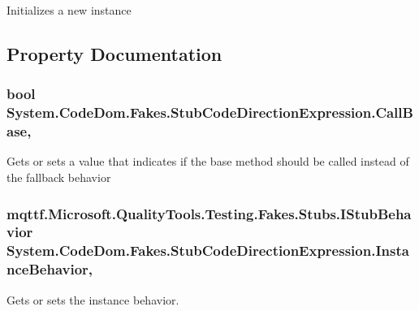 Initializes a new instance



\subsection{Property Documentation}
\hypertarget{class_system_1_1_code_dom_1_1_fakes_1_1_stub_code_direction_expression_aae514affd27491915e47d4a186b77943}{
\subsubsection[{Call\-Base}]{\setlength{\rightskip}{0pt plus 5cm}bool System.\-Code\-Dom.\-Fakes.\-Stub\-Code\-Direction\-Expression.\-Call\-Base\hspace{0.3cm}{\ttfamily [get]}, {\ttfamily [set]}}}\label{class_system_1_1_code_dom_1_1_fakes_1_1_stub_code_direction_expression_aae514affd27491915e47d4a186b77943}


Gets or sets a value that indicates if the base method should be called instead of the fallback behavior

\hypertarget{class_system_1_1_code_dom_1_1_fakes_1_1_stub_code_direction_expression_ad3dd5b794a0e92f513b08c9172bfeb03}{
\subsubsection[{Instance\-Behavior}]{\setlength{\rightskip}{0pt plus 5cm}mqttf.\-Microsoft.\-Quality\-Tools.\-Testing.\-Fakes.\-Stubs.\-I\-Stub\-Behavior System.\-Code\-Dom.\-Fakes.\-Stub\-Code\-Direction\-Expression.\-Instance\-Behavior\hspace{0.3cm}{\ttfamily [get]}, {\ttfamily [set]}}}\label{class_system_1_1_code_dom_1_1_fakes_1_1_stub_code_direction_expression_ad3dd5b794a0e92f513b08c9172bfeb03}


Gets or sets the instance behavior.

